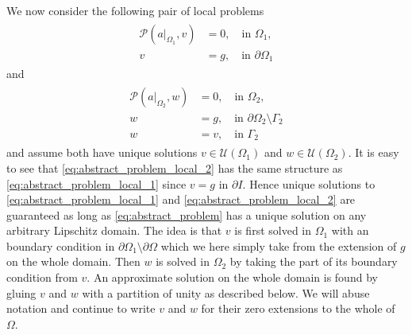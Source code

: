\documentclass[preprint,11pt]{elsarticle}
\theoremstyle{plain}
\newcommand{\U}{\mathcal{U}}
\begin{document}
We now consider the following pair of local problems
\begin{align}
\label{eq:abstract_problem_local_1}
    \begin{split}
    \mathcal{P}(a|_{\Omega_1},v) &= 0, \quad \text{in } \Omega_1, \\
    v &= g, \quad \text{in } \partial \Omega_1
    \end{split}
\end{align}
and
\begin{align}
\label{eq:abstract_problem_local_2}
    \begin{split}
    \mathcal{P}(a|_{\Omega_2},w) &= 0, \quad \text{in } \Omega_2, \\
    w &= g, \quad \text{in } \partial \Omega_2 \setminus \Gamma_2 \\
    w &= v, \quad \text{in } \Gamma_2
    \end{split}
\end{align}
and assume both have unique solutions $v \in \U (\Omega_1)$ and $w \in \U (\Omega_2)$. It is easy to see that \eqref{eq:abstract_problem_local_2} has the same structure as \eqref{eq:abstract_problem_local_1} since $v = g$ in $\partial I$. Hence unique solutions to \eqref{eq:abstract_problem_local_1} and \eqref{eq:abstract_problem_local_2} are guaranteed as long as \eqref{eq:abstract_problem} has a unique solution on any arbitrary Lipschitz domain. The idea is that $v$ is first solved in $\Omega_1$ with an  boundary condition in $\partial \Omega_1 \setminus \partial\Omega$ which we here simply take from the extension of $g$ on the whole domain. Then $w$ is solved in $\Omega_2$ by taking the  part of its boundary condition from $v$. An approximate solution on the whole domain is found by gluing $v$ and $w$ with a partition of unity as described below. We will abuse notation and continue to write $v$ and $w$ for their zero extensions to the whole of $\Omega$.
\end{document}
